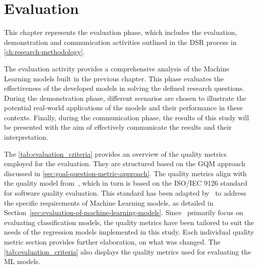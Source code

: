 \chapter{Evaluation}\label{ch:evaluation}
This chapter represents the evaluation phase, which includes the evaluation, demonstration and
communication activities outlined in the \ac{DSR} process in \cref{ch:research-methodology}.

The evaluation activity provides a comprehensive analysis of the Machine Learning models built in the
previous chapter.
This phase evaluates the effectiveness of the developed models in solving the defined research questions.
During the demonstration phase, different scenarios are chosen to illustrate the potential real-world applications of
the models and their performance in these contexts.
Finally, during the communication phase, the results of this study will be presented with the aim of effectively
communicate the results and their interpretation.

The \cref{tab:evaluation_criteria} provides an overview of the quality metrics employed for the evaluation.
They are structured based on the \ac{GQM} approach discussed in \cref{sec:goal-question-metric-approach}.
The quality metrics align with the quality model from~\cite{siebert2022construction}, which in turn is based on
the ISO/IEC 9126 standard for software quality evaluation.
This standard has been adapted by~\cite{siebert2022construction} to address the specific requirements of Machine
Learning models, as detailed in Section~\ref{sec:evaluation-of-machine-learning-models}.
Since~\cite{siebert2022construction} primarily focus on evaluating classification models, the quality metrics have
been tailored to suit the needs of the regression models implemented in this study.
Each individual quality metric section provides further elaboration, on what was changed.
The \cref{tab:evaluation_criteria} also displays the quality metrics used for evaluating the \ac{ML} models.

